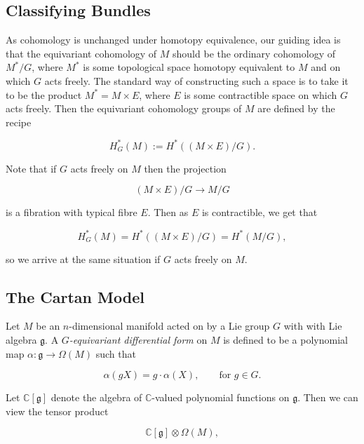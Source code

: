 \documentclass{article}
\newcommand{\ra}{\rightarrow}
\newcommand{\lra}{\longrightarrow}
\newcommand{\W}{\Omega}
\newcommand{\CC}{\mathbb{C}}
\newcommand{\mfg}{\mathfrak{g}}
\begin{document}
\subsection{Classifying Bundles}

As cohomology is unchanged under homotopy equivalence, our guiding idea is that the equivariant cohomology of $M$ should be the ordinary cohomology of $M^{\ast}/G$, where $M^{\ast}$ is some topological space homotopy equivalent to $M$ and on which $G$ acts freely. The standard way of constructing such a space is to take it to be the product $M^{\ast} = M \times E$, where $E$ is some contractible space on which $G$ acts freely. Then the equivariant cohomology groups of $M$ are defined by the recipe

\begin{equation*}
	H_{G}^{\ast}(M) := H^{\ast}\left( (M \times E)/G \right).
\end{equation*}

Note that if $G$ acts freely on $M$ then the projection

\begin{equation*}
	(M \times E)/G \lra M/G
\end{equation*}

is a fibration with typical fibre $E$. Then as $E$ is contractible, we get that

\begin{equation*}
	H_{G}^{\ast}(M) = H^{\ast}\left( (M \times E)/G \right) = H^{\ast}(M/G),
\end{equation*}

so we arrive at the same situation if $G$ acts freely on $M$.

\subsection{The Cartan Model}

Let $M$ be an $n$-dimensional manifold acted on by a Lie group $G$ with with Lie algebra $\mfg$. A \emph{$G$-equivariant differential form} on $M$ is defined to be a polynomial map $\alpha : \mfg \ra \W(M)$ such that

\begin{equation*}
	\alpha(gX) = g \cdot \alpha(X), \qquad \text{for } g \in G.
\end{equation*}

Let $\CC[\mfg]$ denote the algebra of $\CC$-valued polynomial functions on $\mfg$. Then we can view the tensor product

\begin{equation*}
	\CC[\mfg] \otimes \W(M),
\end{equation*}
\end{document}
